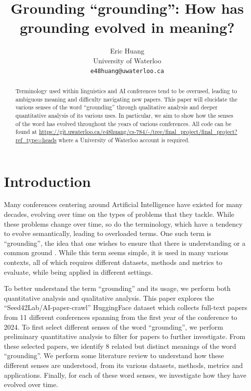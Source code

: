 \documentclass[11pt]{article}
\title{Grounding ``grounding'': How has grounding evolved in meaning?}
\author{Eric Huang \\
  University of Waterloo\\
  \texttt{e48huang@uwaterloo.ca}}
\begin{document}
\maketitle
\begin{abstract}
Terminology used within linguistics and AI conferences tend to be overused, leading to ambiguous meaning and difficulty navigating new papers. This paper will elucidate the various senses of the word ``grounding'' through qualitative analysis and deeper quantitative analysis of its various uses. In particular, we aim to show how the senses of the word has evolved throughout the years of various conferences. All code can be found at \url{https://git.uwaterloo.ca/e48huang/cs-784/-/tree/final_project/final_project?ref_type=heads} where a University of Waterloo account is required.
\end{abstract}

\section{Introduction}
Many conferences centering around Artificial Intelligence have existed for many decades, evolving over time on the types of problems that they tackle. While these problems change over time, so do the terminology, which have a tendency to evolve semantically, leading to overloaded terms. One such term is ``grounding'', the idea that one wishes to ensure that there is understanding or a common ground \cite{nakano-etal-2003-towards}. While this term seems simple, it is used in many various contexts, all of which requires different datasets, methods and metrics to evaluate, while being applied in different settings.

To better understand the term ``grounding'' and its usage, we perform both quantitative analysis and qualitative analysis. This paper explores the ``Seed42Lab/AI-paper-crawl'' HuggingFace dataset \cite{ai-paper-crawl} which collects full-text papers from 11 different conferences spanning from the first year of the conference to 2024. To first select different senses of the word ``grounding'', we perform preliminary quantitative analysis to filter for papers to further investigate. From these selected papers, we identify 8 related but distinct meanings of the word ``grounding''. We perform some literature review to understand how these different senses are understood, from its various datasets, methods, metrics and applications. Finally, for each of these word senses, we investigate how they have evolved over time.
\end{document}
